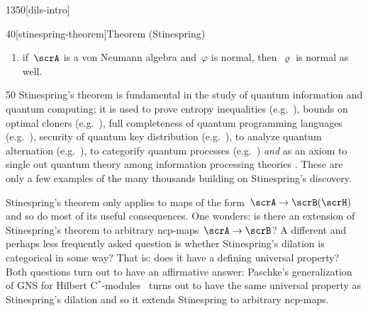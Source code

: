 \begin{parsec}{1350}[dils-intro]
\begin{point}{40}[stinespring-theorem]{Theorem (Stinespring)}
\begin{enumerate}
\item
    if~$\scrA$ is a von Neumann algebra
    and~$\varphi$ is normal, then~$\varrho$ is normal as well.
\end{enumerate}
\end{point}
\spacingfix{}
\begin{point}{50}%
Stinespring's theorem
is fundamental in the study
of quantum information and quantum computing:
it is used to prove entropy inequalities (e.g.~\cite{lindblad}),
bounds on optimal cloners (e.g.~\cite{werner}),
full completeness of quantum programming languages (e.g.~\cite{staton}),
security of quantum key distribution (e.g.~\cite{werner2,kissinger2017picture}),
to analyze quantum alternation (e.g.~\cite{prakash}),
to categorify quantum processes (e.g.~\cite{selinger}) \emph{and}
as an axiom to single out
quantum theory among information processing theories \cite{chiribella}.
These are only a few examples
    of the many thousands building on Stinespring's discovery.

Stinespring's theorem only applies
to maps of the form~$\scrA \to \scrB(\scrH)$
    and so do most of its useful consequences.
One wonders:
    is there an extension of Stinespring's theorem
    to arbitrary ncp-maps~$\scrA \to \scrB$?
A different and perhaps less frequently asked question is whether
     Stinespring's dilation is categorical in some way?
That is: does it have a defining universal property?
Both questions turn out to have an affirmative answer:
Paschke's generalization of GNS for Hilbert C$^*$-modules~\cite{paschke}
    turns out to have the same universal property
        as Stinespring's dilation and so it extends Stinespring
        to arbitrary ncp-maps.


\end{point}
\end{parsec}
